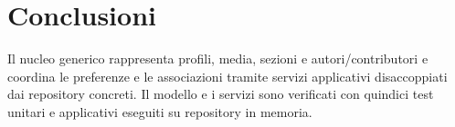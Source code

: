 \chapter{Conclusioni}

Il nucleo generico rappresenta profili, media, sezioni e autori/contributori e coordina le preferenze e le associazioni tramite servizi applicativi disaccoppiati dai repository concreti. Il modello e i servizi sono verificati con quindici test unitari e applicativi eseguiti su repository in memoria.
